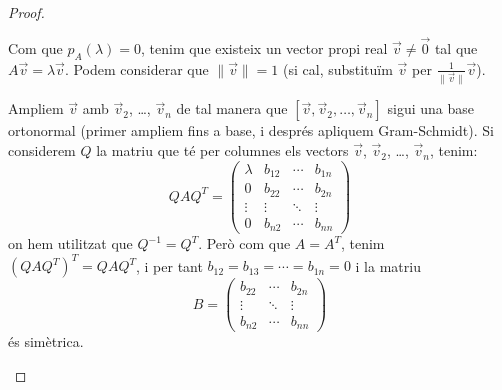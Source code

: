 \documentclass[
  11pt,
]{book}
\numberwithin{dummy}{section}
\theoremstyle{maincolornumbox}
\theoremstyle{blacknumex}
\theoremstyle{blacknumbox}
\theoremstyle{maincolornum}
\newlength\esp
\begin{document}
\begin{proof}
\begin{itemize}
  Com que \(p_A(\lambda)=0\), tenim que existeix un vector propi real
  \(\vec v\neq \vec 0\) tal que \(A\vec v=\lambda \vec v\). Podem
  considerar que \(\|\vec v\|=1\) (si cal, substituïm \(\vec v\) per
  \(\frac{1}{\|\vec v\|}\vec v\)).

  Ampliem \(\vec v\) amb \(\vec v_2\), \ldots, \(\vec v_n\) de tal manera que
  \([\vec v,\vec v_2, \ldots ,\vec v_n]\) sigui una base ortonormal
  (primer ampliem fins a base, i després apliquem Gram-Schmidt). Si
  considerem \(Q\) la matriu que té per columnes els vectors \(\vec v\),
  \(\vec v_2\), \ldots, \(\vec v_n\), tenim:
  \[QAQ^T=\begin{pmatrix} \lambda & b_{12} & \cdots & b_{1n} \\
      0 & b_{22} & \cdots & b_{2n} \\
      \vdots & \vdots & \ddots & \vdots \\
      0 & b_{n2} & \cdots  & b_{nn}
      \end{pmatrix}\] on hem utilitzat que \(Q^{-1}=Q^T\). Però com que
  \(A=A^T\), tenim \((QAQ^T)^T=QAQ^T\), i per tant
  \(b_{12}=b_{13}=\cdots=b_{1n}=0\) i la matriu
  \[B=\begin{pmatrix} b_{22} & \cdots & b_{2n} \\
      \vdots & \ddots & \vdots \\
      b_{n2} & \cdots  & b_{nn}
      \end{pmatrix}\] és simètrica.


\end{itemize}
\end{proof}
\end{document}
